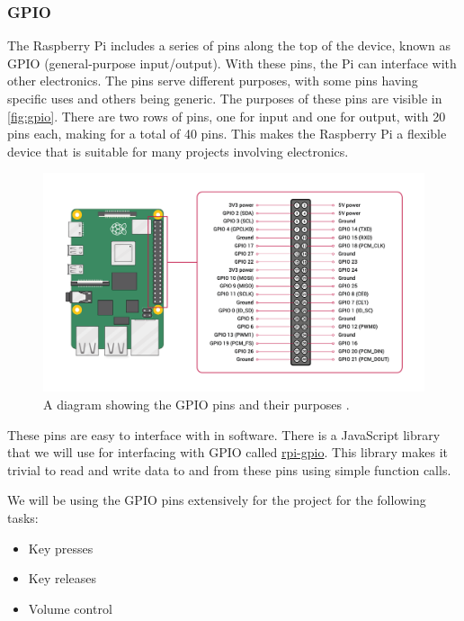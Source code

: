 \subsubsection{GPIO}

The Raspberry Pi includes a series of pins along the top of the device, known as GPIO
(general-purpose input/output). With these pins, the Pi can interface with other
electronics. The pins serve different purposes, with some pins having specific uses and
others being generic. The purposes of these pins are visible in \autoref{fig:gpio}. There
are two rows of pins, one for input and one for output, with 20 pins each, making for a
total of 40 pins. This makes the Raspberry Pi a flexible device that is suitable for many
projects involving electronics.

\begin{figure}
  \centerline{ \includegraphics[width=\linewidth]{image/gpio.png} }
  \caption{A diagram showing the GPIO pins and their purposes \autocite{gpio}.}
  \label{fig:gpio}
\end{figure}

These pins are easy to interface with in software. There is a JavaScript library
that we will use for interfacing with GPIO called \url{rpi-gpio}. This library makes it
trivial to read and write data to and from these pins using simple function calls.

We will be using the GPIO pins extensively for the project for the following tasks:

\begin{itemize}
  \item Key presses
  \item Key releases
  \item Volume control
\end{itemize}

